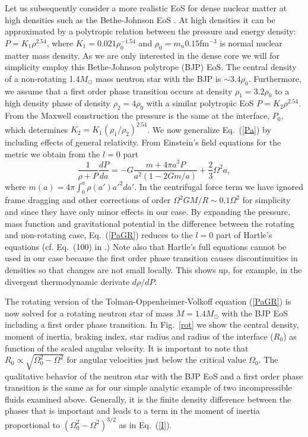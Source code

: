 \begin{multicols}{2}
Let us subsequently 
consider a more realistic EoS for dense nuclear matter at high
densities such as the Bethe-Johnson EoS \cite{BJ}. At
high densities it can be approximated by a polytropic relation between
the pressure and energy density:
$P=K_1\rho^{2.54}$, where 
$K_1=0.021\rho_0^{-1.54}$ and $\rho_0=m_n 0.15$fm$^{-3}$
is normal nuclear matter mass density. 
As we are only interested in the dense core we will for simplicity employ 
this Bethe-Johnson polytrope (BJP) EoS.
The central density of a non-rotating
1.4$M_\odot$
mass neutron star with the BJP is $\sim 3.4\rho_0$.
Furthermore, we assume that a first order phase
transition occurs at density $\rho_1=3.2\rho_0$ to a high density phase
of density $\rho_2=4\rho_0$ with a similar polytropic 
EoS $P=K_2\rho^{2.54}$. From the Maxwell
construction the pressure is the same at the interface, $P_0$,
which determines $K_2=K_1(\rho_1/\rho_2)^{2.54}$. 
We now generalize Eq.\   (\ref{Pa}) by including 
effects of general relativity. From Einstein's field equations for the metric
we obtain from the $l=0$ part 
\begin{equation}
  \frac{1}{\rho+P}\frac{dP}{da} = - G\frac{m+4\pi a^3P}{a^2(1-2Gm/a)} 
                    + \frac{2}{3}\Omega^2 a , 
  \label{PaGR}
\end{equation}
where $m(a)=4\pi\int_0^a\rho(a')a'^2da'$.
In the centrifugal force term
we have ignored frame dragging and other corrections of order
$\Omega^2GM/R\sim 0.1\Omega^2$ for simplicity and 
since they have only minor effects in our case.
By expanding the pressure, mass function and gravitational potential
in the difference between the rotating and non-rotating case, 
Eq.\  (\ref{PaGR}) reduces to the $l=0$ part of
Hartle's equations (cf. Eq.\  (100) in \cite{Hartle}.)
Note also that Hartle's full 
equations cannot be used in our case because the first order
phase transition causes discontinuities in densities so that changes
are not small locally. This shows up, for example, in the divergent
thermodynamic derivate $d\rho/dP$.

The rotating version of the Tolman-Oppenheimer-Volkoff
equation (\ref{PaGR}) is now solved for a rotating neutron star of mass   
$M=1.4M_\odot$ with the BJP EoS including a first order phase transition. 
In Fig.\ \ref{rot} we show 
the central density, moment of inertia, braking index, star radius and
radius of the interface ($R_0$) as function of the scaled angular
velocity. It is important to note that $R_0\propto
\sqrt{\Omega_0^2-\Omega^2}$ for angular velocities just below the
critical value $\Omega_0$. The qualitative behavior of the
neutron star with the BJP EoS and a first order phase
transition is the same as for our simple analytic example of two
incompressible fluids examined above.  Generally, it is the finite
density difference between the phases that is important and leads to a
term in the moment of inertia proportional to
$(\Omega_0^2-\Omega^2)^{3/2}$ as in Eq.\  (\ref{I}).


\end{multicols}
